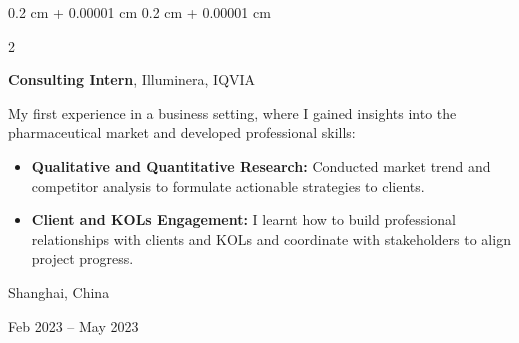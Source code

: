 \documentclass[10pt, letterpaper]{article}
\newenvironment{highlights}{
    \begin{itemize}[
        topsep=0.10 cm,
        parsep=0.10 cm,
        partopsep=0pt,
        itemsep=0pt,
        leftmargin=0.4 cm + 10pt
    ]
}{
    \end{itemize}
} %
\newenvironment{onecolentry}{
    \begin{adjustwidth}{
        0.2 cm + 0.00001 cm
    }{
        0.2 cm + 0.00001 cm
    }
}{
    \end{adjustwidth}
} %
\newenvironment{twocolentry}[2][]{
    \onecolentry
    \def\secondColumn{#2}
    \setcolumnwidth{\fill, 4.5 cm}
    \begin{paracol}{2}
}{
    \switchcolumn \raggedleft \secondColumn
    \end{paracol}
    \endonecolentry
} %
\begin{document}
        \vspace{0.3 cm}

        \begin{twocolentry}{
    Shanghai, China

    Feb 2023 – May 2023
}
    \textbf{Consulting Intern}, Illuminera, IQVIA

    \vspace{0.1cm}
    
    My first experience in a business setting, where I gained insights into the pharmaceutical market and developed professional skills:
    

    \begin{highlights}
        \item \textbf{Qualitative and Quantitative Research:} Conducted market trend and competitor analysis to formulate actionable strategies to clients.

        \vspace{0.1cm}
        
        \item \textbf{Client and KOLs Engagement:} I learnt how to build professional relationships with clients and KOLs and coordinate with stakeholders to align project progress.

        \vspace{0.1cm}
        
    \end{highlights}
\end{twocolentry}

        \vspace{0.3 cm}


    

        
\end{document}

